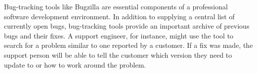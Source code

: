 Bug-tracking tools like Bugzilla are essential components of a professional software development environment. In addition to supplying a central list of currently open bugs, bug-tracking tools provide an important archive of previous bugs and their fixes. A support engineer, for instance, might use the tool to search for a problem similar to one reported by a customer. If a fix was made, the support person will be able to tell the customer which version they need to update to or how to work around the problem.














